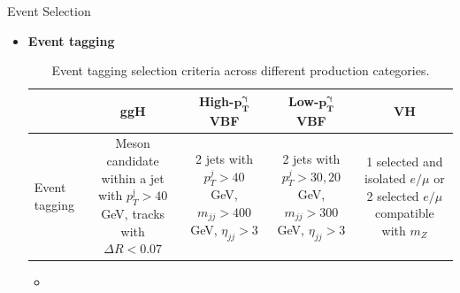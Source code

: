 \documentclass[9pt,aspectratio=1610]{beamer}
\newcommand{\khl}[1]{\textbf{\color{structure}#1}}
\begin{document}
\begin{frame}{Event Selection}
	\begin{itemize}
		\item \khl{Event tagging}
		\vspace{1em}
		\begin{table}[!ht]
			\centering
			\small
			\begin{tabular}{|l|c|c|c|c|}
				\hline
				& \multicolumn{1}{C{8em}}{\textbf{ggH}} & \multicolumn{1}{C{8em}}{\textbf{High-\(\mathbf{p^\gamma_T}\) VBF}} & \multicolumn{1}{C{8em}}{\textbf{Low-\(\mathbf{p^\gamma_T}\) VBF}} &  \multicolumn{1}{C{8em}|}{\textbf{VH}} \\
				\hline
				Event tagging & \multicolumn{1}{C{8em}}{Meson candidate within a jet with \(p_T^\mathrm{j} > 40\) GeV, tracks with \(\Delta R < 0.07\)} & \multicolumn{1}{C{8em}}{2 jets with \(p_T^{j} > 40\) GeV, \(m_{jj} > 400\) GeV, \(\eta_{jj} > 3\)} & \multicolumn{1}{C{8em}}{2 jets with \(p_T^{j} > 30, 20\) GeV, \(m_{jj} > 300\) GeV, \(\eta_{jj} > 3\)} & \multicolumn{1}{C{8em}|}{1 selected and isolated \(e/\mu\) or 2 selected \(e/\mu\) compatible with \(m_Z\)}\\
				\hline
			\end{tabular}
			\caption{Event tagging selection criteria across different production categories.}
		\end{table}
		\begin{itemize}
			\item 
		\end{itemize}
	\end{itemize}
\end{frame}
\end{document}
